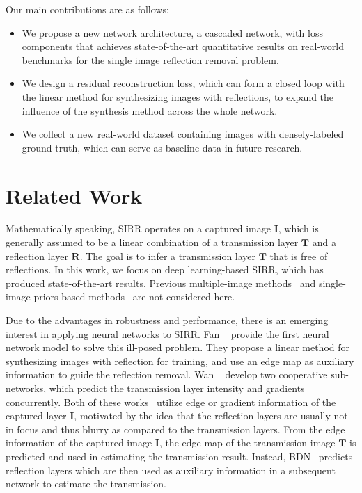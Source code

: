 \documentclass[10pt,twocolumn,letterpaper]{article}
\begin{document}
Our main contributions are as follows:
\begin{itemize}[noitemsep,topsep=0pt]
    \setlength{\itemsep}{1pt}
    \setlength{\parskip}{0pt}
    \setlength{\parsep}{0pt}
    \item We propose a new network architecture, a cascaded network, with loss components that achieves state-of-the-art quantitative results on real-world benchmarks for the single image reflection removal problem.
\item We design a residual reconstruction loss, which can form a closed loop with the linear method for synthesizing images with reflections, to expand the influence of the synthesis method across the whole network.
    \item We collect a new real-world dataset containing images with densely-labeled ground-truth, which can serve as baseline data in future research. 
\end{itemize}

\section{Related Work}
Mathematically speaking, SIRR operates on a captured image $\mathbf{I}$, which is generally assumed to be a linear combination of a transmission layer $\mathbf{T}$ and a reflection layer $\mathbf{R}$. The goal is to infer a transmission layer $\mathbf{T}$ that is free of reflections. 
In this work, we focus on deep learning-based SIRR, which has produced state-of-the-art results. Previous multiple-image methods~\cite{xue2015computational, guo2014robust, li2013exploiting, sun2016automatic, sarel2004separating, gai2011blind, szeliski2000layer, han2017reflection} and single-image-priors based methods~\cite{levin2004separating, li2014single, levin2003learning, springer2017reflection, arvanitopoulos2017single, wan2016depth, li2013exploiting, tuncer2011ground} are not considered here.


Due to the advantages in robustness and performance, there is an emerging interest in applying neural networks to SIRR. Fan \etal~\cite{fan2017generic} provide the first neural network model to solve this ill-posed problem. They propose a linear method for synthesizing images with reflection for training, and use an edge map as auxiliary information to guide the reflection removal. Wan \etal~\cite{wan2018crrn} develop two cooperative sub-networks, which predict the transmission layer intensity and gradients concurrently. Both of these works~\cite{fan2017generic, wan2018crrn} utilize edge or gradient information of the captured layer $\mathbf{I}$, motivated by the idea that the reflection layers are usually not in focus and thus blurry as compared to the transmission layers. 
From the edge information of the captured image $\mathbf{I}$, the edge map of the transmission image $\mathbf{T}$ is predicted and used in estimating the transmission result.
Instead, BDN~\cite{yang2018seeing} predicts reflection layers which are then used as auxiliary information in a subsequent network to estimate the transmission.
\end{document}
